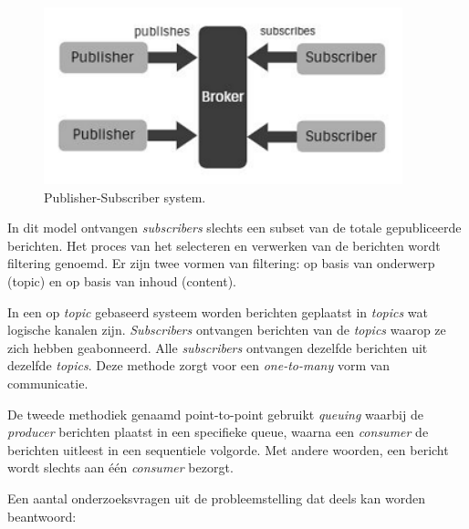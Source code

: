 \begin{figure}[h]
  \centering
  \includegraphics[width=.4\textwidth]{../voorstel/img/fig1-publish-subscribe.png}
  \caption{\label{fig:img}Publisher-Subscriber system\autocite{Sharvari2019}.}
\end{figure}

In dit model ontvangen \emph{subscribers} slechts een subset van de totale gepubliceerde berichten. 
Het proces van het selecteren en verwerken van de berichten wordt filtering genoemd. 
Er zijn twee vormen van filtering: op basis van onderwerp (topic) en op basis van inhoud (content).
\newline

In een op \emph{topic} gebaseerd systeem worden berichten geplaatst in \emph{topics} wat logische kanalen zijn.
\emph{Subscribers} ontvangen berichten van de \emph{topics} waarop ze zich hebben geabonneerd.
Alle \emph{subscribers} ontvangen dezelfde berichten uit dezelfde \emph{topics}. 
Deze methode zorgt voor een \emph{one-to-many} vorm van communicatie.
\newline

De tweede methodiek genaamd point-to-point gebruikt \emph{queuing} waarbij de \emph{producer} berichten plaatst in een specifieke queue, 
waarna een \emph{consumer} de berichten uitleest in een sequentiele volgorde. 
Met andere woorden, een bericht wordt slechts aan één \emph{consumer} bezorgt.


Een aantal onderzoeksvragen uit de probleemstelling dat deels kan worden beantwoord:

